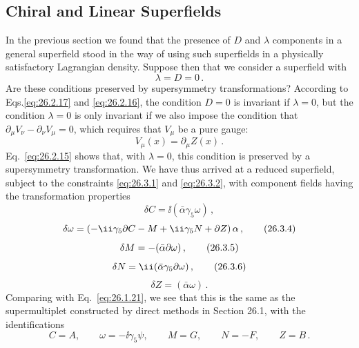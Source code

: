 
\subsection{Chiral and Linear Superfields}

\providecommand{\SuperD}{\mathcal{D}}

In the previous section we found that the presence of $D$ and $\lambda$
components in a general superfield stood in the way of using such superfields
in a physically satisfactory Lagrangian density. Suppose then that we consider
a superfield with
\begin{equation}
  \lambda=D=0\,.
  \tag{26.3.1}\label{eq:26.3.1}
\end{equation}
Are these conditions preserved by supersymmetry transformations? According to
Eqs.\linebreak \eqref{eq:26.2.17} and \eqref{eq:26.2.16}, the condition $D=0$ is
invariant if $\lambda=0$, but the condition $\lambda=0$ is only invariant if
we also impose the condition that
$\partial_\mu V_\nu-\partial_\nu V_\mu=0$, which requires that $V_\mu$ be a
pure gauge:
\begin{equation}
  V_\mu(x)=\partial_\mu Z(x)\,.
  \tag{26.3.2}\label{eq:26.3.2}
\end{equation}
Eq.~\eqref{eq:26.2.15} shows that, with $\lambda=0$, this condition is
preserved by a supersymmetry transformation. We have thus arrived at a reduced
superfield, subject to the constraints \eqref{eq:26.3.1} and
\eqref{eq:26.3.2}, with component fields having the transformation properties
\begin{equation}
  \delta C=\ii(\bar\alpha\gamma_5\omega)\,,
  \tag{26.3.3}\label{eq:26.3.3}
\end{equation}
\begin{equation}
  \delta\omega=
  \left(-\ii\gamma_5\sl{\partial}C-M+\ii\gamma_5N+\sl{\partial}Z\right)\alpha\,,
  \tag{26.3.4}\label{eq:26.3.4}
\end{equation}
\begin{equation}
  \delta M=-(\bar\alpha\sl{\partial}\omega)\,,
  \tag{26.3.5}\label{eq:26.3.5}
\end{equation}
\begin{equation}
  \delta N=\ii(\bar\alpha\gamma_5\sl{\partial}\omega)\,,
  \tag{26.3.6}\label{eq:26.3.6}
\end{equation}
\begin{equation}
  \delta Z=(\bar\alpha\omega)\,.
  \tag{26.3.7}\label{eq:26.3.7}
\end{equation}
Comparing with Eq.~\eqref{eq:26.1.21}, we see that this is the same as the
supermultiplet constructed by direct methods in Section 26.1, with the
identifications
\begin{equation}
  C=A,\qquad
  \omega=-\ii\gamma_5\psi,\qquad
  M=G,\qquad
  N=-F,\qquad
  Z=B\,.
  \tag{26.3.8}\label{eq:26.3.8}
\end{equation}

